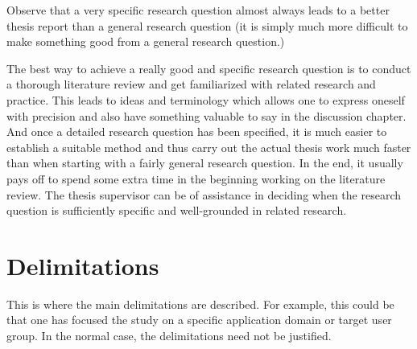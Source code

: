 Observe that a very specific research question almost always
leads to a better thesis report than a general research question
(it is simply much more difficult to make something good
from a general research question.)

The best way to achieve a really good and specific research
question is to conduct a thorough literature review and get
familiarized with related research and practice. This leads to
ideas and terminology which allows one to express oneself
with precision and also have something valuable to say in the
discussion chapter. And once a detailed research question
has been specified, it is much easier to establish a suitable
method and thus carry out the actual thesis work much faster
than when starting with a fairly general research question. In
the end, it usually pays off to spend some extra time in the
beginning working on the literature review. The thesis
supervisor can be of assistance in deciding when the research
question is sufficiently specific and well-grounded in related
research.

\section{Delimitations}
\label{sec:delimitations}

This is where the main delimitations are described. For
example, this could be that one has focused the study on a
specific application domain or target user group. In the
normal case, the delimitations need not be justified.